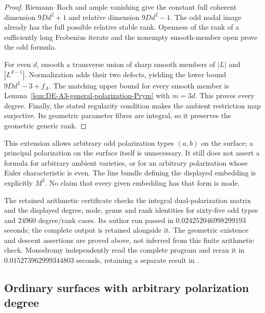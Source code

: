 \begin{proof}
Riemann--Roch and ample vanishing give the constant full coherent
dimension $9Dd^2+1$ and relative dimension $9Dd^2-1$.
The odd nodal image already has the full possible relative stable
rank.  Openness of the rank of a sufficiently long Frobenius iterate
and the nonempty smooth-member open prove the odd formula.

For even $d$, smooth a transverse union of sharp smooth members of
$|L|$ and $|L^{d-1}|$.  Normalization adds their two defects, yielding
the lower bound $9Dd^2-3+f_A$.  The matching upper bound for every
smooth member is Lemma~\ref{lem:DE-A3-general-polarization-Prym}
with $m=3d$.  This proves every degree.
Finally, the stated regularity condition makes the ambient restriction
map surjective.  Its geometric parameter fibres are integral, so it
preserves the geometric generic rank.
\end{proof}

\begin{remark}
\label{rem:DE-A3-separable-rank-scope}
This extension allows arbitrary odd polarization types $(a,b)$ on the
surface; a principal polarization on the surface itself is unnecessary.
It still does not assert a formula for arbitrary ambient varieties,
or for an arbitrary polarization whose Euler characteristic is even.
The line bundle defining the displayed embedding is explicitly
$M^3$.  No claim that every given embedding has that form is made.

The retained arithmetic certificate
checks the integral dual-polarization matrix and the displayed
degree, node, genus and rank identities for sixty-five odd types
and $24960$ degree/rank cases.  Its author run passed in
$0.024252046998299193$ seconds; the complete output is retained
alongside it.  The geometric existence and descent assertions are
proved above, not inferred from this finite arithmetic check.
Monodromy independently read the complete program and reran it in
$0.015273962999344803$ seconds, retaining a separate result in
.
\end{remark}


\subsection{Ordinary surfaces with arbitrary polarization degree}
\label{sec:DE-A3-ordinary-all-polarizations}


